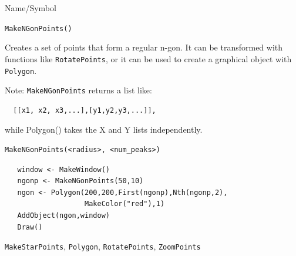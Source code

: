 \begin{desc}{Name/Symbol}
\item[Name/Symbol]	\verb+MakeNGonPoints()+

\item[Description] 
Creates a set of points that form a regular n-gon.  It can be
transformed with functions like \verb+RotatePoints+, or it can be 
used to create a graphical object with \verb+Polygon+.

Note: \verb+MakeNGonPoints+ returns a list like:
\begin{verbatim}
  [[x1, x2, x3,...],[y1,y2,y3,...]],
\end{verbatim}
while Polygon() takes the X and Y lists independently.

\item[Usage]
\begin{verbatim}
MakeNGonPoints(<radius>, <num_peaks>)
\end{verbatim}

\item[Example]	
\begin{verbatim}
   window <- MakeWindow()
   ngonp <- MakeNGonPoints(50,10)
   ngon <- Polygon(200,200,First(ngonp),Nth(ngonp,2),
                   MakeColor("red"),1)
   AddObject(ngon,window)
   Draw()
\end{verbatim}

\item[See Also]	
\verb+MakeStarPoints+, \verb+Polygon+, \verb+RotatePoints+, \verb+ZoomPoints+
\end{desc}



